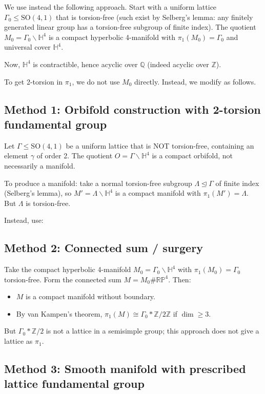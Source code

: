 \documentclass[12pt]{article}
\begin{document}
We use instead the following approach.  Start with a uniform lattice $\Gamma_0 \leq \mathrm{SO}(4,1)$ that is torsion-free (such exist by Selberg's lemma: any finitely generated linear group has a torsion-free subgroup of finite index).  The quotient $M_0 = \Gamma_0 \backslash \mathbb{H}^4$ is a compact hyperbolic 4-manifold with $\pi_1(M_0) = \Gamma_0$ and universal cover $\mathbb{H}^4$.

Now, $\mathbb{H}^4$ is contractible, hence acyclic over $\mathbb{Q}$ (indeed acyclic over $\mathbb{Z}$).

To get 2-torsion in $\pi_1$, we do not use $M_0$ directly.  Instead, we modify as follows.

\subsection*{Method 1: Orbifold construction with 2-torsion fundamental group}

Let $\Gamma \leq \mathrm{SO}(4,1)$ be a uniform lattice that is NOT torsion-free, containing an element $\gamma$ of order 2.  The quotient $O = \Gamma \backslash \mathbb{H}^4$ is a compact orbifold, not necessarily a manifold.

To produce a manifold: take a normal torsion-free subgroup $\Lambda \trianglelefteq \Gamma$ of finite index (Selberg's lemma), so $M' = \Lambda \backslash \mathbb{H}^4$ is a compact manifold with $\pi_1(M') = \Lambda$.  But $\Lambda$ is torsion-free.

Instead, use:

\subsection*{Method 2: Connected sum / surgery}

Take the compact hyperbolic 4-manifold $M_0 = \Gamma_0\backslash\mathbb{H}^4$ with $\pi_1(M_0)=\Gamma_0$ torsion-free.  Form the connected sum $M = M_0 \# \mathbb{RP}^4$.  Then:
\begin{itemize}
  \item $M$ is a compact manifold without boundary.
  \item By van Kampen's theorem, $\pi_1(M) \cong \Gamma_0 * \mathbb{Z}/2\mathbb{Z}$ if $\dim\geq 3$.
\end{itemize}
But $\Gamma_0 * \mathbb{Z}/2$ is not a lattice in a semisimple group; this approach does not give a lattice as $\pi_1$.

\subsection*{Method 3: Smooth manifold with prescribed lattice fundamental group}
\end{document}
